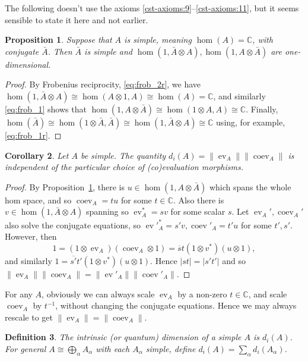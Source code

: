 \documentclass[a4paper,11pt]{article}
\theoremstyle{plain}
\newtheorem{proposition}{Proposition}[section]
\newtheorem{corollary}[proposition]{Corollary}
\newtheorem{definition}[proposition]{Definition}
\theoremstyle{remark}
\newcommand{\ev}{\operatorname{ev}}
\newcommand{\coev}{\operatorname{coev}}
\newcommand{\conj}[1]{\bar{#1}}
\begin{document}
The following doesn't use the axioms \ref{cst-axioms:9}--\ref{cst-axioms:11}, but it seems sensible to state it here and not earlier.

\begin{proposition}\label{prop:simple_passes_to_conj_etc}
Suppose that $A$ is simple, meaning $\hom(A)=\mathbb C$, with conjugate $\conj{A}$.  Then $\conj{A}$ is simple and $\hom(1,\conj{A}\otimes A), \hom(1,A\otimes\conj{A})$ are one-dimensional.
\end{proposition}
\begin{proof}
By Frobenius reciprocity, \eqref{eq:frob_2r}, we have $\hom(1,\conj{A}\otimes A) \cong \hom(A\otimes 1, A) \cong \hom(A) = \mathbb C$, and similarly \eqref{eq:frob_1} shows that $\hom(1,A\otimes\conj{A}) \cong \hom(1\otimes A, A) \cong \mathbb C$.  Finally, $\hom(\conj A) \cong \hom(1\otimes\conj{A}, \conj{A}) \cong \hom(1, \conj{A}\otimes A) \cong \mathbb C$ using, for example, \eqref{eq:frob_1r}.
\end{proof}

\begin{corollary}
Let $A$ be simple.  The quantity $d_i(A) = \|\ev_A\| \|\coev_A\|$ is independent of the particular choice of (co)evaluation morphisms.
\end{corollary}
\begin{proof}
By Proposition~\ref{prop:simple_passes_to_conj_etc}, there is $u\in\hom(1,A \otimes\conj A)$ which spans the whole hom space, and so $\coev_A = tu$ for some $t\in\mathbb C$.  Also there is $v\in\hom(1,\conj A \otimes A)$ spanning so $\ev_A^* = sv$ for some scalar $s$.  Let $\ev_A', \coev_A'$ also solve the conjugate equations, so ${\ev'}_A^* = s'v, \coev'_A = t'u$ for some $t', s'$.  However, then
\[ 1 = (1\otimes\ev_A)(\coev_A\otimes 1) = \overline{s} t (1\otimes v^*)(u\otimes 1), \]
and similarly $1 = \overline{s'}t' (1\otimes v^*)(u\otimes 1)$.  Hence $|st| = |s't'|$ and so $\|\ev_A\| \|\coev_A\| = \|\ev'_A\| \|\coev'_A\|$.
\end{proof}

For any $A$, obviously we can always scale $\ev_A$ by a non-zero $t\in\mathbb C$, and scale $\coev_A$ by $t^{-1}$, without changing the conjugate equations.  Hence we may always rescale to get $\|\ev_A\| = \|\coev_A\|$.

\begin{definition}
The \emph{intrinsic (or quantum) dimension} of a simple $A$ is $d_i(A)$.  For general $A \cong \bigoplus_\alpha A_\alpha$ with each $A_\alpha$ simple, define $d_i(A) = \sum_\alpha d_i(A_\alpha)$.
\end{definition}
\end{document}
